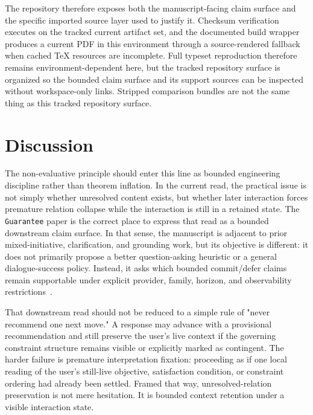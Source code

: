 \documentclass[11pt]{article}
\begin{document}
The repository therefore exposes both the manuscript-facing claim surface and
the specific imported source layer used to justify it. Checksum verification
executes on the tracked current artifact set, and the documented build wrapper
produces a current PDF in this environment through a source-rendered fallback
when cached TeX resources are incomplete. Full typeset reproduction therefore
remains environment-dependent here, but the tracked repository surface is
organized so the bounded claim surface and its support sources can be inspected
without workspace-only links. Stripped comparison bundles are not the same
thing as this tracked repository surface.

\section{Discussion}

The non-evaluative principle should enter this line as bounded engineering
discipline rather than theorem inflation. In the current read, the practical issue
is not simply whether unresolved content exists, but whether later interaction
forces premature relation collapse while the interaction is still in a retained
state. The \texttt{Guarantee} paper is the correct place to express that read as
a bounded downstream claim surface. In that sense, the manuscript is adjacent to
prior mixed-initiative, clarification, and grounding work, but its objective is
different: it does not primarily propose a better question-asking heuristic or a
general dialogue-success policy. Instead, it asks which bounded commit/defer
claims remain supportable under explicit provider, family, horizon, and
observability restrictions~\cite{chucarroll2000mimic,deboni2003clarification,rao2018evpi,benotti2021grounding,sahay-etal-2025-ask,wen-etal-2025-know,madhusudhan-etal-2025-llms}.

That downstream read should not be reduced to a simple rule of "never recommend
one next move." A response may advance with a provisional recommendation and
still preserve the user's live context if the governing constraint structure
remains visible or explicitly marked as contingent. The harder failure is
premature interpretation fixation: proceeding as if one local reading of the
user's still-live objective, satisfaction condition, or constraint ordering had
already been settled. Framed that way, unresolved-relation preservation is not
mere hesitation. It is bounded context retention under a visible interaction
state.
\end{document}

